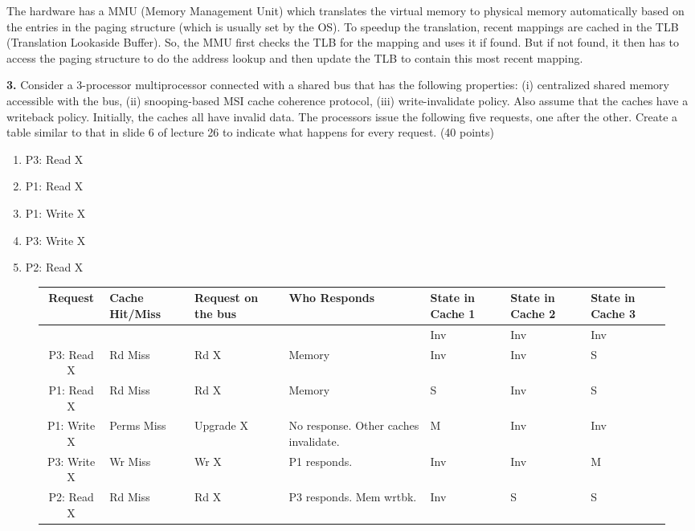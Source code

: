 \documentclass{article}
\begin{document}
The hardware has a MMU (Memory Management Unit) which translates the virtual memory to physical memory
automatically based on the entries in the paging structure (which is usually set by the OS). To speedup
the translation, recent mappings are cached in the TLB (Translation Lookaside Buffer).
So, the MMU first checks the TLB for the mapping and uses it if found. But if not found, it then
has to access the paging structure to do the address lookup and then update the TLB to contain this
most recent mapping.

\newpage

\textbf{3.} Consider a 3-processor multiprocessor connected with a shared bus that has the following properties:
(i) centralized shared memory accessible with the bus, (ii) snooping-based MSI cache coherence protocol,
(iii) write-invalidate policy. Also assume that the caches have a writeback policy.
Initially, the caches all have invalid data. The processors issue the following five requests, one after the other.
Create a table similar to that in slide 6 of lecture 26 to indicate what happens for every request. (40 points)

\begin{enumerate}
\item P3: Read X
\item P1: Read X
\item P1: Write X
\item P3: Write X
\item P2: Read X
\end{enumerate}

\begin{figure}
\centering
\begin{tabularx}{\linewidth}{|c|X|X|X|X|X|X|} 
    \hline
    Request & Cache Hit/Miss & Request on the bus & Who Responds & State in Cache 1 & State in Cache 2 & State in Cache 3 \\ [0.5ex] 
    \hline\hline
     & & & & Inv & Inv & Inv \\ 
    \hline
    P3: Read X & Rd Miss & Rd X & Memory & Inv & Inv & S \\
    \hline
    P1: Read X & Rd Miss & Rd X & Memory & S & Inv & S \\
    \hline
    P1: Write X & Perms Miss & Upgrade X & No response. Other caches invalidate. & M & Inv & Inv \\
    \hline
    P3: Write X & Wr Miss & Wr X & P1 responds. & Inv & Inv & M \\
    \hline
    P2: Read X & Rd Miss & Rd X & P3 responds. Mem wrtbk. & Inv & S & S \\
    \hline
\end{tabularx}
\end{figure}
\end{document}
